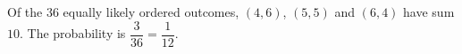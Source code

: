 Of the $36$ equally likely ordered outcomes, $(4,6)$, $(5,5)$ and $(6,4)$ have sum $10$. The probability is $\dfrac{3}{36}=\boxed{\dfrac{1}{12}}$.
